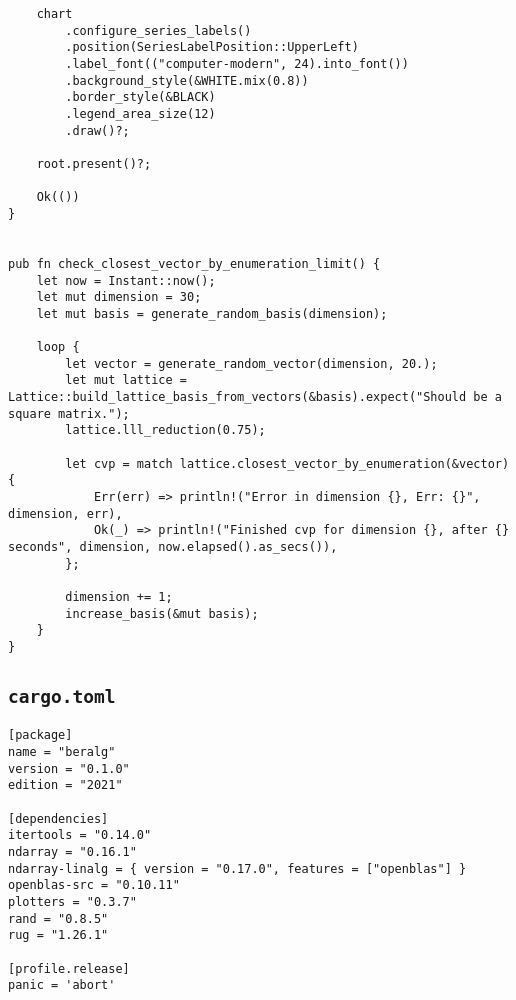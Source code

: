 \begin{verbatim}
    chart
        .configure_series_labels()
        .position(SeriesLabelPosition::UpperLeft)
        .label_font(("computer-modern", 24).into_font())
        .background_style(&WHITE.mix(0.8))
        .border_style(&BLACK)
        .legend_area_size(12)
        .draw()?;

    root.present()?;

    Ok(())
}


pub fn check_closest_vector_by_enumeration_limit() {
    let now = Instant::now();
    let mut dimension = 30;
    let mut basis = generate_random_basis(dimension);     

    loop {
        let vector = generate_random_vector(dimension, 20.);
        let mut lattice = Lattice::build_lattice_basis_from_vectors(&basis).expect("Should be a square matrix.");
        lattice.lll_reduction(0.75);
        
        let cvp = match lattice.closest_vector_by_enumeration(&vector) {
            Err(err) => println!("Error in dimension {}, Err: {}", dimension, err),
            Ok(_) => println!("Finished cvp for dimension {}, after {} seconds", dimension, now.elapsed().as_secs()),
        };

        dimension += 1;        
        increase_basis(&mut basis);
    }
}
\end{verbatim}


\subsection{\texttt{cargo.toml}}

\begin{verbatim}
[package]
name = "beralg"
version = "0.1.0"
edition = "2021"

[dependencies]
itertools = "0.14.0"
ndarray = "0.16.1"
ndarray-linalg = { version = "0.17.0", features = ["openblas"] }
openblas-src = "0.10.11"
plotters = "0.3.7"
rand = "0.8.5"
rug = "1.26.1"

[profile.release]
panic = 'abort'
\end{verbatim}
